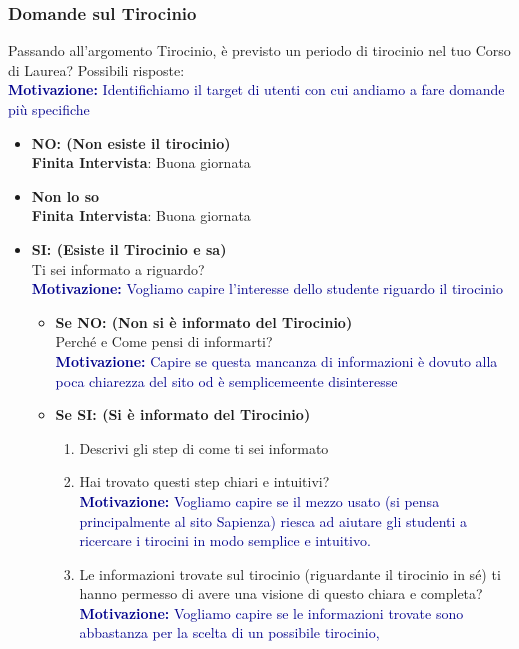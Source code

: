 \subsubsection{Domande sul Tirocinio}
Passando all'argomento Tirocinio, è previsto un periodo di tirocinio nel tuo Corso di Laurea? Possibili risposte:\\
\textcolor{darkblue}{\textbf{Motivazione:} Identifichiamo il target di utenti con cui andiamo a fare domande più specifiche}
\begin{itemize}
    \item \textbf{NO: (Non esiste il tirocinio)}\\
    \textbf{Finita Intervista}: Buona giornata
    \item \textbf{Non lo so}\\
    \textbf{Finita Intervista}: Buona giornata
    \item \textbf{SI: (Esiste il Tirocinio e sa)}\\
    Ti sei informato a riguardo?\\
    \textcolor{darkblue}{\textbf{Motivazione:} Vogliamo capire l'interesse dello studente riguardo il tirocinio}
    \begin{itemize}
        \item \textbf{Se NO: (Non si è informato del Tirocinio)}\\
        Perché e Come pensi di informarti?\\
        \textcolor{darkblue}{\textbf{Motivazione:} Capire se questa mancanza di informazioni è dovuto alla poca chiarezza del sito od è semplicemeente disinteresse}
        \item \textbf{Se SI: (Si è informato del Tirocinio)}
        \begin{enumerate}
            \item Descrivi gli step di come ti sei informato
            \item Hai trovato questi step chiari e intuitivi?\\
            \textcolor{darkblue}{\textbf{Motivazione:} Vogliamo capire se il mezzo usato (si pensa principalmente al sito Sapienza) riesca ad aiutare gli studenti a ricercare i tirocini in modo semplice e intuitivo.}
            \item Le informazioni trovate sul tirocinio (riguardante il tirocinio in sé) ti hanno permesso di avere una visione di questo chiara e completa?\\
            \textcolor{darkblue}{\textbf{Motivazione:} Vogliamo capire se le informazioni trovate sono abbastanza per la scelta di un possibile tirocinio, 
}
\end{enumerate}
\end{itemize}
\end{itemize}
